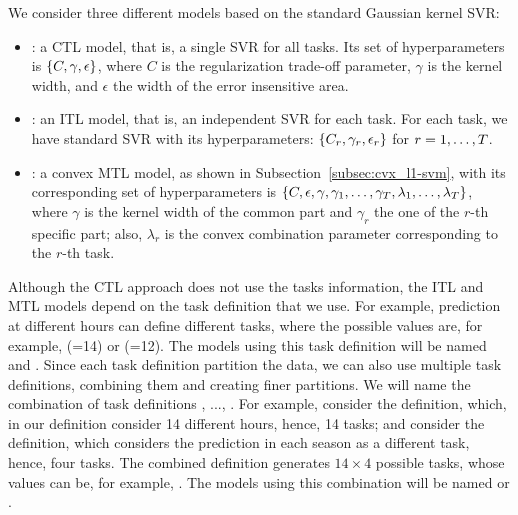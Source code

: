 %
We consider three different models based on the standard Gaussian kernel SVR:
\begin{itemize}
    \item {}: a CTL model, that is, a single SVR for all tasks. Its set of hyperparameters is $\left\{C, \gamma, \epsilon\right\}$, where $C$ is the regularization trade-off parameter, $\gamma$ is the kernel width, and $\epsilon$ the width of the error insensitive area.
    \item {}: an ITL model, that is, an independent SVR for each task. For each task, we have standard SVR with its hyperparameters: $\left\{C_r, \gamma_r, \epsilon_r\right\}$ for $r=1, \ldots, T$.
    \item {}: a convex MTL model, as shown in Subsection~\ref{subsec:cvx_l1-svm}, with its corresponding set of hyperparameters is $\left\{C, \epsilon, \gamma, \gamma_1, \ldots, \gamma_T, \lambda_1, \ldots, \lambda_T\right\}$, where $\gamma$ is the kernel width of the common part and $\gamma_r$ the one of the $r$-th specific part; also, $\lambda_r$ is the convex combination parameter corresponding to the $r$-th task.
\end{itemize}
%
Although the CTL approach does not use the tasks information, the ITL and MTL models depend on the task definition that we use. For example, prediction at different hours can define different tasks, where the possible values are, for example, (=14) or (=12). The models using this task definition will be named  and . 
%
Since each task definition partition the data, we can also use multiple task definitions, combining them and creating finer partitions. 
We will name  the combination of task definitions , ..., . For example, consider the  definition, which, in our definition consider 14 different hours, hence, 14 tasks; and consider the  definition, which considers the prediction in each season as a different task, hence, four tasks. The combined definition  generates $14 \times 4$ possible tasks, whose values can be, for example, .
The models using this combination will be named  or .

